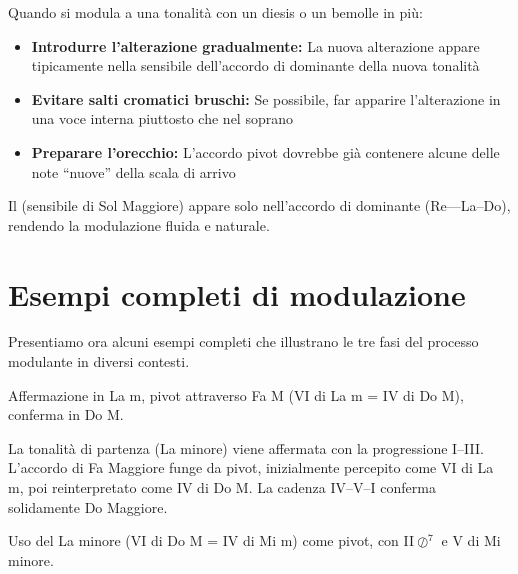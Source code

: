 \begin{regola}
	\label{reg:introduzione_alterazioni}
	Quando si modula a una tonalità con un diesis o un bemolle in più:
	
	\begin{itemize}
		\item \textbf{Introdurre l'alterazione gradualmente:} La nuova alterazione appare tipicamente nella sensibile dell'accordo di dominante della nuova tonalità
		\item \textbf{Evitare salti cromatici bruschi:} Se possibile, far apparire l'alterazione in una voce interna piuttosto che nel soprano
		\item \textbf{Preparare l'orecchio:} L'accordo pivot dovrebbe già contenere alcune delle note ``nuove'' della scala di arrivo
	\end{itemize}
\end{regola}

\begin{esempio}
	\label{ex:gestione_fad}

	Il \Fadiesis  (sensibile di Sol Maggiore) appare solo nell'accordo di dominante (Re--\Fadiesis --La--Do), rendendo la modulazione fluida e naturale.
\end{esempio}

\section{Esempi completi di modulazione}
\label{sec:esempi_completi}

Presentiamo ora alcuni esempi completi che illustrano le tre fasi del processo modulante in diversi contesti.

\begin{esempio}
	\label{ex:mod_completa_lam_dom}
	Affermazione in La m, pivot attraverso Fa M (VI di La m = IV di Do M), conferma in Do M.

	La tonalità di partenza (La minore) viene affermata con la progressione I--III. L'accordo di Fa Maggiore funge da pivot, inizialmente percepito come VI di La m, poi reinterpretato come IV di Do M. La cadenza IV--V--I conferma solidamente Do Maggiore.
\end{esempio}

\begin{esempio}
	\label{ex:mod_settima_do_mim}
	Uso del La minore (VI di Do M = IV di Mi m) come pivot, con II$\oslash^7$ e V di Mi minore.

\end{esempio}

